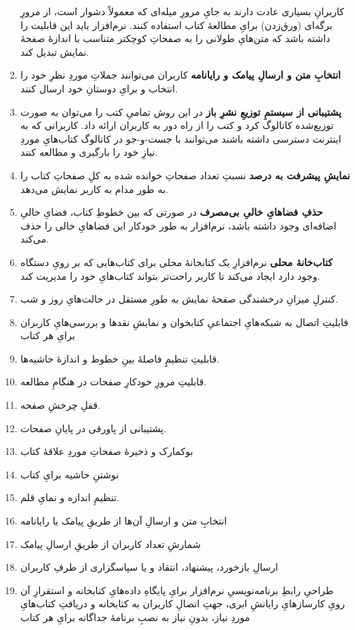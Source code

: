 \documentclass[]{article}
\begin{document}
\begin{enumerate}
کاربرانِ بسیاری عادت دارند به جایِ مرورِ میله‌ای که معمولاً دشوار است، از مرورِ برگه‌ای (ورق‌زدن) برایِ مطالعهٔ کتاب استفاده کنند. نرم‌افزار باید این قابلیت را داشته باشد که متن‌هایِ طولانی را به صفحاتِ کوچکتر متناسب با اندازهٔ صفحهٔ نمایش تبدیل کند.
	\item \textbf{انتخابِ متن و ارسالِ پیامک و رایانامه}
کاربران می‌توانند جملاتِ موردِ نظرِ خود را انتخاب و برایِ دوستانِ خود ارسال کنند.
	\item \textbf{پشتیبانی از سیستمِ توزیعِ نشرِ باز}
در این روش تمامیِ کتب را می‌توان به صورت توزیع‌شده کاتالوگ کرد و کتب را از راه دور به کاربران ارائه داد. کاربرانی که به اینترنت دسترسی داشته باشند می‌توانند با جست-و-جو در کاتالوگ کتاب‌هایِ موردِ نیازِ خود را بارگیری و مطالعه کنند.
	\item \textbf{نمایشِ پیشرفت به درصد}
نسبتِ تعداد صفحاتِ خوانده شده به کلِ صفحاتِ کتاب را به طور مدام به کاربر نمایش می‌دهد.
	\item \textbf{حذفِ فضاهایِ خالیِ بی‌مصرف}
در صورتی که بین خطوطِ کتاب، فضایِ خالیِ اضافه‌ای وجود داشته باشد، نرم‌افزار به طور خودکار این فضاهایِ خالی را حذف می‌کند.
	\item \textbf{کتاب‌خانهٔ محلی}
نرم‌افزارِ یک کتابخانهٔ محلی برای کتاب‌هایی که بر رویِ دستگاه وجود دارد ایجاد می‌کند تا کاربر راحت‌تر بتواند کتاب‌هایِ خود را مدیریت کند.
	\item کنترلِ میزانِ درخشندگی صفحهٔ نمایش به طورِ مستقل در حالت‌هایِ روز و شب.
	\item قابلیتِ اتصال به شبکه‌هایِ اجتماعیِ کتابخوان و نمایشِ نقدها و بررسی‌هایِ کاربران برایِ هر کتاب
	\item قابلیتِ تنظیمِِ فاصلهٔ بینِ خطوط و اندازهٔ حاشیه‌ها.
	\item قابلیتِ مرورِ خودکارِ صفحات در هنگامِ مطالعه.
	\item قفلِ چرخشِ صفحه.
	\item پشتیبانی از پاورقی در پایانِ صفحات.
	\item بوکمارک و ذخیرهٔ صفحاتِ موردِ علاقهٔ کتاب
	\item نوشتنِ حاشیه برایِ کتاب
	\item تنظیمِ اندازه و نمایِ قلم.
	\item انتخابِ متن و ارسالِ آن‌ها از طریقِ پیامک یا رایانامه
	\item شمارشِ تعداد کاربران از طریقِ ارسالِ پیامک
	\item ارسالِ بازخورد، پیشنهاد، انتقاد و یا سپاسگزاری از طرفِ کاربران
	\item طراحیِ رابطِ برنامه‌نویسیِ نرم‌افزار برایِ پایگاهِ داده‌هایِ کتابخانه و استقرارِ آن رویِ کارسازهایِ رایانشِ ابری، جهتِ اتصالِ کاربران به کتابخانه و دریافتِ کتاب‌هایِ موردِ نیاز، بدونِ نیاز به نصبِ برنامهٔ جداگانه برایِ هر کتاب
\end{enumerate}
\end{document}
